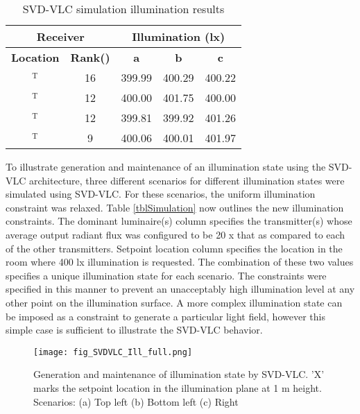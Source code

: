 \renewcommand{\arraystretch}{1.1}
\begin{table}[!b] %
\caption{SVD-VLC simulation illumination results}
\label{tblSimulation2}
\centering
	\begin{tabular}{|c|c|c|c|c|}
		\hline
		\multicolumn{2}{|c|}{\bf{Receiver}} & \multicolumn{3}{|c|}{\bf{Illumination (lx)}}\\
		\hline
		{\bf{Location}} & {\bf{Rank(\vm{H})}} & {\bf{a}} & {\bf{b}} & {\bf{c}}\\
		\hline
		[1.6 0.6 1.0]$^{\text{T}}$ & 16 & 399.99 & 400.29 & 400.22\\
		\hline
		[2.8 0.4 1.4]$^{\text{T}}$ & 12 & 400.00 & 401.75 & 400.00\\
		\hline
		[0.2 0.8 1.0]$^{\text{T}}$ & 12 & 399.81 & 399.92 & 401.26\\
		\hline
		[1.2 1.4 1.6]$^{\text{T}}$ & 9 & 400.06 & 400.01 & 401.97\\
		\hline
	\end{tabular}
\end{table}
\renewcommand{\arraystretch}{1.0}
To  illustrate generation and maintenance of an illumination state using the SVD-VLC architecture, three different scenarios for different illumination states were simulated using SVD-VLC. For these scenarios, the uniform illumination constraint was relaxed. Table \ref{tblSimulation} now outlines the new illumination constraints. The dominant luminaire(s) column specifies the transmitter(s) whose average output radiant flux  was configured to be 20 x that as compared to each of the other transmitters. Setpoint location column specifies the location in the room where 400 lx illumination is requested. The combination of these two values specifies a unique illumination state for each scenario. The constraints were specified in this manner to prevent an unacceptably high illumination level at any other point on the illumination surface. A more complex illumination state can be imposed as a constraint to generate a particular light field, however this simple case is sufficient to illustrate the SVD-VLC behavior.

\begin{figure}[!t]
	\centering
		\texttt{[image: fig\_SVDVLC\_Ill\_full.png]}
	\caption[Generation and maintenance of illumination state by SVD-VLC]{Generation and maintenance of illumination state by SVD-VLC. 'X' marks the setpoint location in the illumination plane at 1 m height. Scenarios: (a) Top left (b) Bottom left (c) Right }
	\label{figIllSVD}
\end{figure}

